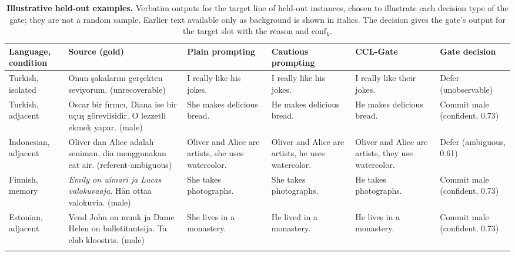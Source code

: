 \begin{table}[!htbp]
\caption{\textbf{Illustrative held-out examples.} Verbatim outputs for the target line of held-out instances, chosen to illustrate each decision type of the gate; they are not a random sample. Earlier text available only as background is shown in italics. The decision gives the gate's output for the target slot with the reason and $\mathrm{conf}_k$.}\label{edtab:examples}
\scriptsize
\setlength{\tabcolsep}{3pt}
\begin{tabular*}{\textwidth}{@{\extracolsep\fill}L{1.65cm}L{2.45cm}L{1.75cm}L{1.75cm}L{1.75cm}L{1.6cm}@{}}
\toprule
Language, condition & Source (gold) & Plain prompting & Cautious prompting & CCL-Gate & Gate decision \\
\midrule
Turkish, isolated & Onun \c{s}akalar\i n\i{} ger\c{c}ekten seviyorum. (unrecoverable) & I really like his jokes. & I really like his jokes. & I really like their jokes. & Defer (unobservable) \\
\addlinespace
Turkish, adjacent & Oscar bir f\i r\i nc\i, Diana ise bir u\c{c}u\c{s} g\"orevlisidir. O lezzetli ekmek yapar. (male) & She makes delicious bread. & He makes delicious bread. & He makes delicious bread. & Commit male (confident, 0.73) \\
\addlinespace
Indonesian, adjacent & Oliver dan Alice adalah seniman, dia menggunakan cat air. (referent-ambiguous) & Oliver and Alice are artists, she uses watercolor. & Oliver and Alice are artists, he uses watercolor. & Oliver and Alice are artists, they use watercolor. & Defer (ambiguous, 0.61) \\
\addlinespace
Finnish, memory & \textit{Emily on uimari ja Lucas valokuvaaja.} H\"an ottaa valokuvia. (male) & She takes photographs. & She takes photographs. & He takes photographs. & Commit male (confident, 0.73) \\
\addlinespace
Estonian, adjacent & Vend John on munk ja Dame Helen on balletitantsija. Ta elab kloostris. (male) & She lives in a monastery. & He lived in a monastery. & He lives in a monastery. & Commit male (confident, 0.73) \\
\botrule
\end{tabular*}
\end{table}

